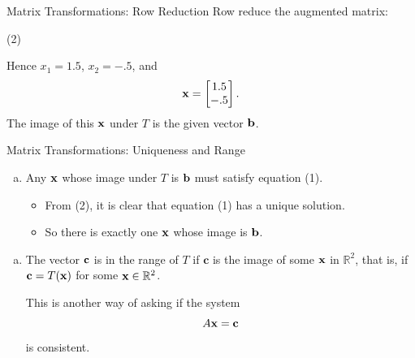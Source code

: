 \begin{frame}{Matrix Transformations: Row Reduction}
Row reduce the augmented matrix:
  \small
\begin{center}
\resizebox{.96\linewidth}{!}{$\displaystyle
\left[\begin{array}{cc|c}1&-3&3\\3&5&2\\-1&7&-5\end{array}\right]
\sim
\left[\begin{array}{cc|c}1&-3&3\\0&14&-7\\0&4&-2\end{array}\right]
\sim
\left[\begin{array}{cc|c}1&-3&3\\0&1&-.5\\0&0&0\end{array}\right]
\sim
\left[\begin{array}{cc|c}1&0&1.5\\0&1&-.5\\0&0&0\end{array}\right]
$}
\end{center}
\par\hfill(2)\par\smallskip

\pause
Hence $x_1=1.5$, $x_2=-.5$, and
\[
\mathbf{x}=\begin{bmatrix}1.5\\-.5\end{bmatrix}.
\]
The image of this $\mathbf{x}$ under $T$ is the given vector $\mathbf{b}$.
\end{frame}

\begin{frame}{Matrix Transformations: Uniqueness and Range}
\begin{enumerate}[c.]

\item Any $\mathbf{x}$ whose image under $T$ is $\mathbf{b}$ must satisfy equation (1).\pause
\begin{itemize}
\item From (2), it is clear that equation (1) has a unique solution.\pause
\item So there is exactly one $\mathbf{x}$ whose image is $\mathbf{b}$.\pause
\end{itemize}
\end{enumerate}

\medskip
\begin{enumerate}[d.]
\item The vector $\mathbf{c}$ is in the range of $T$ if $\mathbf{c}$ is the image of some $\mathbf{x}$ in $\mathbb{R}^2$, that is, if
$\mathbf{c}=T(\mathbf{x})$ for some $\mathbf{x}\in\mathbb{R}^2$. \pause


This is another way of asking if the system
\[
A\mathbf{x}=\mathbf{c}
\]
is consistent.
\end{enumerate}
\end{frame}

